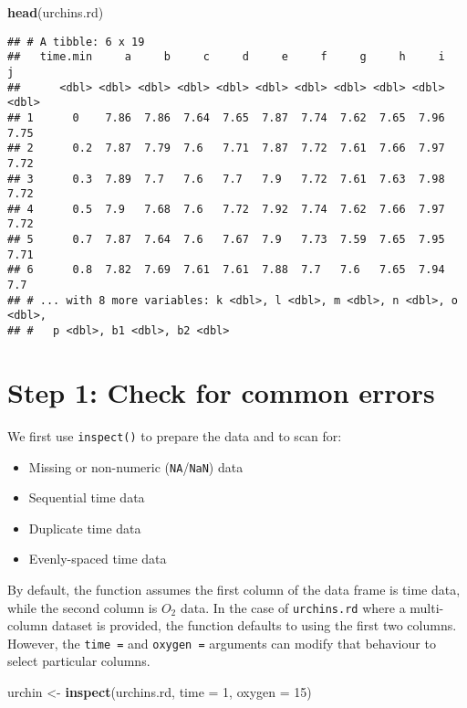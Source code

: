 \documentclass[]{book}
\newenvironment{Shaded}{\begin{snugshade}}{\end{snugshade}}
\newcommand{\KeywordTok}[1]{\textcolor[rgb]{0.13,0.29,0.53}{\textbf{#1}}}
\newcommand{\DataTypeTok}[1]{\textcolor[rgb]{0.13,0.29,0.53}{#1}}
\newcommand{\DecValTok}[1]{\textcolor[rgb]{0.00,0.00,0.81}{#1}}
\newcommand{\StringTok}[1]{\textcolor[rgb]{0.31,0.60,0.02}{#1}}
\newcommand{\NormalTok}[1]{#1}
\providecommand{\tightlist}{%
  \setlength{\itemsep}{0pt}\setlength{\parskip}{0pt}}
\begin{document}
\begin{Shaded}
\begin{Highlighting}[]
\KeywordTok{head}\NormalTok{(urchins.rd)}
\end{Highlighting}
\end{Shaded}

\begin{verbatim}
## # A tibble: 6 x 19
##   time.min     a     b     c     d     e     f     g     h     i     j
##      <dbl> <dbl> <dbl> <dbl> <dbl> <dbl> <dbl> <dbl> <dbl> <dbl> <dbl>
## 1      0    7.86  7.86  7.64  7.65  7.87  7.74  7.62  7.65  7.96  7.75
## 2      0.2  7.87  7.79  7.6   7.71  7.87  7.72  7.61  7.66  7.97  7.72
## 3      0.3  7.89  7.7   7.6   7.7   7.9   7.72  7.61  7.63  7.98  7.72
## 4      0.5  7.9   7.68  7.6   7.72  7.92  7.74  7.62  7.66  7.97  7.72
## 5      0.7  7.87  7.64  7.6   7.67  7.9   7.73  7.59  7.65  7.95  7.71
## 6      0.8  7.82  7.69  7.61  7.61  7.88  7.7   7.6   7.65  7.94  7.7 
## # ... with 8 more variables: k <dbl>, l <dbl>, m <dbl>, n <dbl>, o <dbl>,
## #   p <dbl>, b1 <dbl>, b2 <dbl>
\end{verbatim}

\section{Step 1: Check for common
errors}\label{step-1-check-for-common-errors}

We first use \texttt{inspect()} to prepare the data and to scan for:

\begin{itemize}
\tightlist
\item
  Missing or non-numeric (\texttt{NA}/\texttt{NaN}) data
\item
  Sequential time data
\item
  Duplicate time data
\item
  Evenly-spaced time data
\end{itemize}

By default, the function assumes the first column of the data frame is
time data, while the second column is \(O_2\) data. In the case of
\texttt{urchins.rd} where a multi-column dataset is provided, the
function defaults to using the first two columns. However, the
\texttt{time\ =} and \texttt{oxygen\ =} arguments can modify that
behaviour to select particular columns.

\begin{Shaded}
\begin{Highlighting}[]
\NormalTok{urchin <-}\StringTok{ }\KeywordTok{inspect}\NormalTok{(urchins.rd, }\DataTypeTok{time =}  \DecValTok{1}\NormalTok{, }\DataTypeTok{oxygen =} \DecValTok{15}\NormalTok{)}
\end{Highlighting}
\end{Shaded}
\end{document}
